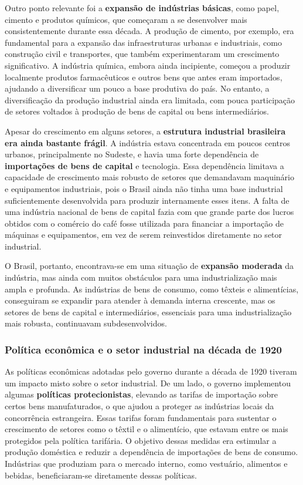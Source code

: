 \documentclass[a4paper,12pt]{article}[abntex2]
\begin{document}
Outro ponto relevante foi a \textbf{expansão de indústrias básicas}, como papel, cimento e produtos químicos, que começaram a se desenvolver mais consistentemente durante essa década. A produção de cimento, por exemplo, era fundamental para a expansão das infraestruturas urbanas e industriais, como construção civil e transportes, que também experimentaram um crescimento significativo. A indústria química, embora ainda incipiente, começou a produzir localmente produtos farmacêuticos e outros bens que antes eram importados, ajudando a diversificar um pouco a base produtiva do país. No entanto, a diversificação da produção industrial ainda era limitada, com pouca participação de setores voltados à produção de bens de capital ou bens intermediários.

Apesar do crescimento em alguns setores, a \textbf{estrutura industrial brasileira era ainda bastante frágil}. A indústria estava concentrada em poucos centros urbanos, principalmente no Sudeste, e havia uma forte dependência de \textbf{importações de bens de capital} e tecnologia. Essa dependência limitava a capacidade de crescimento mais robusto de setores que demandavam maquinário e equipamentos industriais, pois o Brasil ainda não tinha uma base industrial suficientemente desenvolvida para produzir internamente esses itens. A falta de uma indústria nacional de bens de capital fazia com que grande parte dos lucros obtidos com o comércio do café fosse utilizada para financiar a importação de máquinas e equipamentos, em vez de serem reinvestidos diretamente no setor industrial.

O Brasil, portanto, encontrava-se em uma situação de \textbf{expansão moderada} da indústria, mas ainda com muitos obstáculos para uma industrialização mais ampla e profunda. As indústrias de bens de consumo, como têxteis e alimentícias, conseguiram se expandir para atender à demanda interna crescente, mas os setores de bens de capital e intermediários, essenciais para uma industrialização mais robusta, continuavam subdesenvolvidos.

\subsubsection{Política econômica e o setor industrial na década de 1920}

As políticas econômicas adotadas pelo governo durante a década de 1920 tiveram um impacto misto sobre o setor industrial. De um lado, o governo implementou algumas \textbf{políticas protecionistas}, elevando as tarifas de importação sobre certos bens manufaturados, o que ajudou a proteger as indústrias locais da concorrência estrangeira. Essas tarifas foram fundamentais para sustentar o crescimento de setores como o têxtil e o alimentício, que estavam entre os mais protegidos pela política tarifária. O objetivo dessas medidas era estimular a produção doméstica e reduzir a dependência de importações de bens de consumo. Indústrias que produziam para o mercado interno, como vestuário, alimentos e bebidas, beneficiaram-se diretamente dessas políticas.
\end{document}
